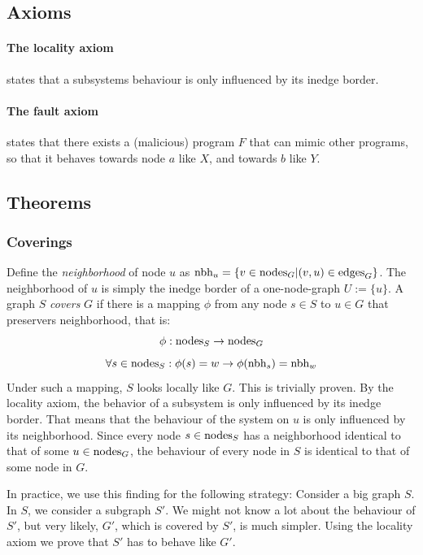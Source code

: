 \subsection{Axioms}
\paragraph{The locality axiom} states that a subsystems behaviour is only influenced by its inedge border.
\paragraph{The fault axiom} states that there exists a (malicious) program $F$ that can mimic other programs, so that it behaves towards node $a$ like $X$, and towards $b$ like $Y$. 

\subsection{Theorems}

\subsubsection{Coverings}
Define the \emph{neighborhood} of node $u$ as $\text{nbh}_u = \{ v \in  \text{nodes}_{G}  | (v, u) \in  \text{edges}_{G}  \}$. The neighborhood of $u$ is simply the inedge border of a one-node-graph $U := \{u\}$. A graph $S$ \emph{covers} $G$ if there is a mapping $\phi$ from any node $s \in S$ to $u \in G$ that preservers neighborhood, that is: 
$$ \phi:  \text{nodes}_{S}  \to  \text{nodes}_{G}  $$
$$ \forall s \in  \text{nodes}_{S} : \phi(s) = w \to \phi( \text{nbh}_s ) = \text{nbh}_w $$
Under such a mapping, $S$ looks locally like $G$. This is trivially proven. By the locality axiom, the behavior of a subsystem is only influenced by its inedge border. That means that the behaviour of the system on $u$ is only influenced by its neighborhood. Since every node $s \in  \text{nodes}_{S} $ has a neighborhood identical to that of some $u \in  \text{nodes}_{G} $, the behaviour of every node in $S$ is identical to that of some node in $G$.

In practice, we use this finding for the following strategy: Consider a big graph $S$. In $S$, we consider a subgraph $S'$. We might not know a lot about the behaviour of $S'$, but very likely, $G'$, which is covered by $S'$, is much simpler. Using the locality axiom we prove that $S'$ has to behave like $G'$.

